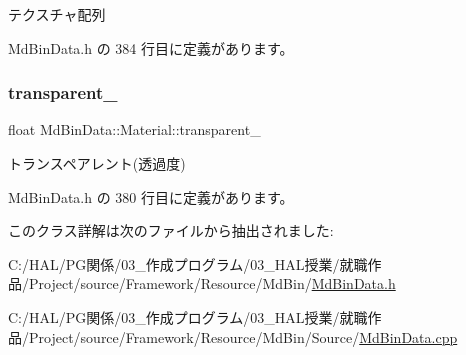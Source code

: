テクスチャ配列 



 Md\+Bin\+Data.\+h の 384 行目に定義があります。

\mbox{\label{class_md_bin_data_1_1_material_a1d6d026a2e515d99c43bce457a99fb58}} 
\subsubsection{\texorpdfstring{transparent\+\_\+}{transparent\_}}
{\footnotesize\ttfamily float Md\+Bin\+Data\+::\+Material\+::transparent\+\_\+\hspace{0.3cm}{\ttfamily [private]}}



トランスペアレント(透過度) 



 Md\+Bin\+Data.\+h の 380 行目に定義があります。



このクラス詳解は次のファイルから抽出されました\+:\begin{DoxyCompactItemize}
\item 
C\+:/\+H\+A\+L/\+P\+G関係/03\+\_\+作成プログラム/03\+\_\+\+H\+A\+L授業/就職作品/\+Project/source/\+Framework/\+Resource/\+Md\+Bin/\mbox{\hyperlink{_md_bin_data_8h}{Md\+Bin\+Data.\+h}}\item 
C\+:/\+H\+A\+L/\+P\+G関係/03\+\_\+作成プログラム/03\+\_\+\+H\+A\+L授業/就職作品/\+Project/source/\+Framework/\+Resource/\+Md\+Bin/\+Source/\mbox{\hyperlink{_md_bin_data_8cpp}{Md\+Bin\+Data.\+cpp}}\end{DoxyCompactItemize}
